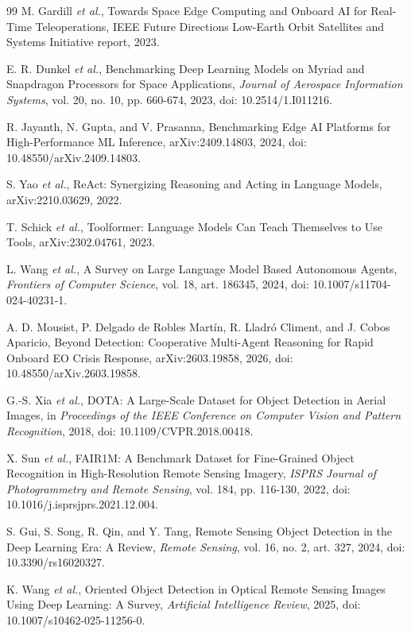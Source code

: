\documentclass[10pt,letterpaper]{article}
\begin{document}
\begin{thebibliography}{99}
M. Gardill \emph{et al.}, Towards Space Edge Computing and Onboard AI for Real-Time Teleoperations, IEEE Future Directions Low-Earth Orbit Satellites and Systems Initiative report, 2023.

E. R. Dunkel \emph{et al.}, Benchmarking Deep Learning Models on Myriad and Snapdragon Processors for Space Applications, \emph{Journal of Aerospace Information Systems}, vol. 20, no. 10, pp. 660-674, 2023, doi: 10.2514/1.I011216.

R. Jayanth, N. Gupta, and V. Prasanna, Benchmarking Edge AI Platforms for High-Performance ML Inference, arXiv:2409.14803, 2024, doi: 10.48550/arXiv.2409.14803.

S. Yao \emph{et al.}, ReAct: Synergizing Reasoning and Acting in Language Models, arXiv:2210.03629, 2022.

T. Schick \emph{et al.}, Toolformer: Language Models Can Teach Themselves to Use Tools, arXiv:2302.04761, 2023.

L. Wang \emph{et al.}, A Survey on Large Language Model Based Autonomous Agents, \emph{Frontiers of Computer Science}, vol. 18, art. 186345, 2024, doi: 10.1007/s11704-024-40231-1.

A. D. Mousist, P. Delgado de Robles Mart\'{i}n, R. Lladr\'{o} Climent, and J. Cobos Aparicio, Beyond Detection: Cooperative Multi-Agent Reasoning for Rapid Onboard EO Crisis Response, arXiv:2603.19858, 2026, doi: 10.48550/arXiv.2603.19858.

G.-S. Xia \emph{et al.}, DOTA: A Large-Scale Dataset for Object Detection in Aerial Images, in \emph{Proceedings of the IEEE Conference on Computer Vision and Pattern Recognition}, 2018, doi: 10.1109/CVPR.2018.00418.

X. Sun \emph{et al.}, FAIR1M: A Benchmark Dataset for Fine-Grained Object Recognition in High-Resolution Remote Sensing Imagery, \emph{ISPRS Journal of Photogrammetry and Remote Sensing}, vol. 184, pp. 116-130, 2022, doi: 10.1016/j.isprsjprs.2021.12.004.

S. Gui, S. Song, R. Qin, and Y. Tang, Remote Sensing Object Detection in the Deep Learning Era: A Review, \emph{Remote Sensing}, vol. 16, no. 2, art. 327, 2024, doi: 10.3390/rs16020327.

K. Wang \emph{et al.}, Oriented Object Detection in Optical Remote Sensing Images Using Deep Learning: A Survey, \emph{Artificial Intelligence Review}, 2025, doi: 10.1007/s10462-025-11256-0.

\end{thebibliography}
\end{document}
